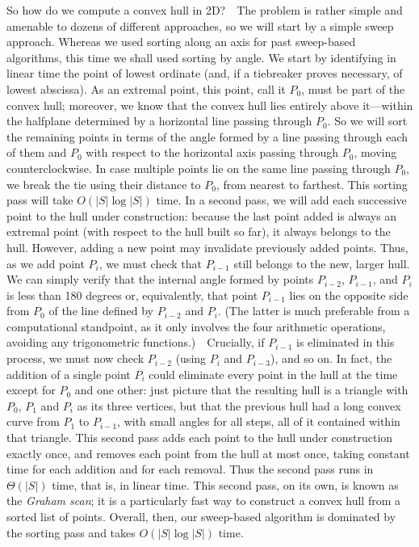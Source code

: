 \documentclass[11pt]{article}
\begin{document}
So how do we compute a convex hull in 2D?\ \ The problem is rather simple
and amenable to dozens of different approaches, so we will start by a simple
sweep approach.  Whereas we used sorting along an axis for past sweep-based
algorithms, this time we shall used sorting by angle.  We start by identifying
in linear time the point of lowest ordinate (and, if a tiebreaker proves
necessary, of lowest abscissa).  As an extremal point, this point, call it
$P_0$, must be part of the convex hull; moreover, we know that the convex
hull lies entirely above it---within the halfplane determined by a horizontal
line passing through $P_0$.  So we will sort the remaining points in terms of
the angle formed by a line passing through each of them and $P_0$ with respect
to the horizontal axis passing through $P_0$, moving counterclockwise.
In case multiple points lie on the same line passing through $P_0$, we
break the tie using their distance to $P_0$, from nearest to farthest.
This sorting pass will take $O(|S|\log|S|)$ time.
In a second pass, we will add each successive point to the hull under
construction: because the last point added is always an extremal point
(with respect to the hull built so far), it always belongs to the hull.
However, adding a new point may invalidate previously added points.
Thus, as we add point $P_i$, we must check that $P_{i-1}$ still belongs
to the new, larger hull.  We can simply verify that the internal angle
formed by points $P_{i-2}$, $P_{i-1}$, and $P_i$ is less than 180 degrees
or, equivalently, that point $P_{i-1}$ lies on the opposite side from $P_0$
of the line defined by $P_{i-2}$ and $P_i$.  (The latter is much preferable
from a computational standpoint, as it only involves the four arithmetic
operations, avoiding any trigonometric functions.)\ \ Crucially, if $P_{i-1}$
is eliminated in this process, we must now check $P_{i-2}$ (using $P_i$ and
$P_{i-3}$), and so on.  In fact, the addition of a single point $P_i$ could
eliminate every point in the hull at the time except for $P_0$ and one other:
just picture that the resulting hull is a triangle with $P_0$, $P_1$ and $P_i$
as its three vertices, but that the previous hull had a long convex curve
from $P_1$ to $P_{i-1}$, with small angles for all steps, all of it contained
within that triangle.  This second pass adds each point to the hull under
construction exactly once, and removes each point from the hull at most once,
taking constant time for each addition and for each removal.  Thus the second
pass runs in $\Theta(|S|)$ time, that is, in linear time.  This second pass,
on its own, is known as the \emph{Graham scan}; it is a particularly fast way
to construct a convex hull from a sorted list of points.
Overall, then, our sweep-based algorithm is dominated by the sorting pass
and takes $O(|S|\log|S|)$ time.
\end{document}
